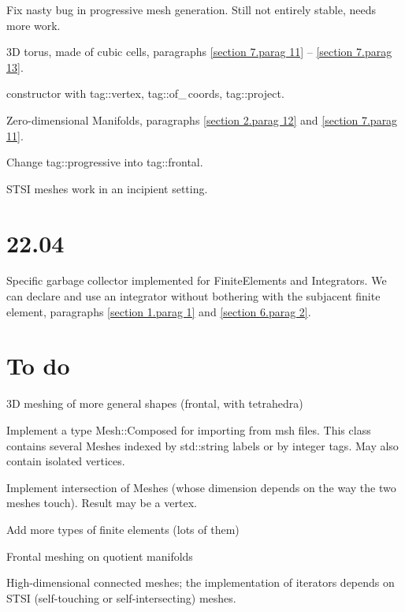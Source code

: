 \documentclass[a4paper]{scrreprt}
\def\numb{}
\newcommand\verm[1]{\textcolor{manif}{#1}}
\renewcommand\tt{\normalfont\ttfamily}
\begin{document}
\noindent Fix nasty bug in progressive mesh generation.
Still not entirely stable, needs more work.

\noindent 3D torus, made of cubic cells, paragraphs \ref{\numb section 7.\numb parag 11} --
\ref{\numb section 7.\numb parag 13}.

\noindent {\small\tt\verm{Cell}} constructor with {\small\tt\textcolor{tag}{tag}::vertex},
{\small\tt\textcolor{tag}{tag}::of\_\,coords}, {\small\tt\textcolor{tag}{tag}::project}.

\noindent Zero-dimensional {\small\tt\verm{Manifold}}s, paragraphs
\ref{\numb section 2.\numb parag 12} and \ref{\numb section 7.\numb parag 11}.

\noindent Change {\small\tt\textcolor{tag}{tag}::progressive} into
{\small\tt\textcolor{tag}{tag}::frontal}.

\noindent STSI meshes work in an incipient setting.


\section*{22.04}

\noindent Specific garbage collector implemented for
{\small\tt\verm{FiniteElement}}s and {\small\tt\verm{Integrator}}s.
We can declare and use an integrator without bothering with the subjacent finite element,
paragraphs \ref{\numb section 1.\numb parag 1} and \ref{\numb section 6.\numb parag 2}.


\section*{To do}

\noindent 3D meshing of more general shapes (frontal, with tetrahedra)

\noindent Implement a type {\small\tt\verm{Mesh}::Composed} for importing from 
{\small\tt msh} files.
This class contains several {\small\tt\verm{Mesh}}es indexed by {\small\tt std::string}
labels or by integer tags.
May also contain isolated vertices.

\noindent Implement intersection of {\small\tt\verm{Mesh}}es (whose dimension depends on the
way the two meshes touch).
Result may be a vertex.

\noindent Add more types of finite elements (lots of them)

\noindent Frontal meshing on quotient manifolds

\noindent High-dimensional connected meshes; the implementation of iterators depends
on STSI (self-touching or self-intersecting) meshes.
\end{document}
